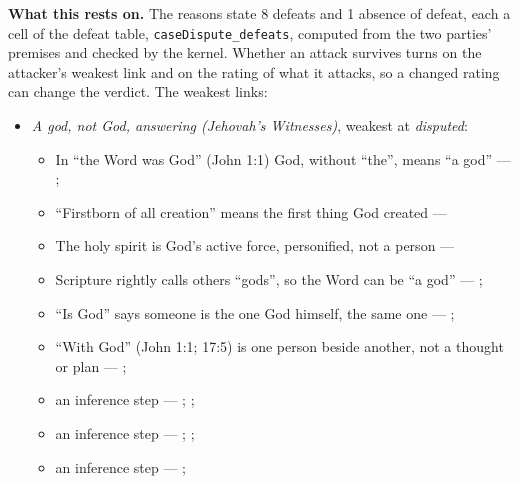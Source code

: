 \documentclass[11pt,paper=\testimonypaper,DIV=13,parskip=false]{scrartcl}
\begin{document}
\par\noindent\textbf{What this rests on.} The reasons state 8 defeats and 1 absence of defeat, each a cell of the defeat table, \texttt{case\allowbreak{}Dispute\_\allowbreak{}defeats}, computed from the two parties' premises and checked by the kernel. Whether an attack survives turns on the attacker's weakest link and on the rating of what it attacks, so a changed rating can change the verdict. The weakest links:
\begin{itemize}
\item \emph{A god, not God, answering (Jehovah’s Witnesses)}, weakest at \emph{disputed}:
\begin{itemize}
\item In “the Word was God” (John 1:1) God, without “the”, means “a god” --- \cite[27]{watchtower-should-you-believe-trinity-1989}; \cite{new-world-translation-2013}
\item “Firstborn of all creation” means the first thing God created --- \cite[14]{watchtower-should-you-believe-trinity-1989}
\item The holy spirit is God’s active force, personified, not a person --- \cite[20--23]{watchtower-should-you-believe-trinity-1989}
\item Scripture rightly calls others “gods”, so the Word can be “a god” --- \cite[28]{watchtower-should-you-believe-trinity-1989}; \cite[31]{watchtower-questions-from-readers-1986}
\item “Is God” says someone is the one God himself, the same one --- \cite[ch. 8, Are Jesus and the Father One in Purpose Only?]{bernard-oneness-of-god-1983}; \cite[27]{watchtower-should-you-believe-trinity-1989}
\item “With God” (John 1:1; 17:5) is one person beside another, not a thought or plan --- \cite[3, The Triune God]{kibbey-living-systematic-theology-2026}; \cite[27]{watchtower-should-you-believe-trinity-1989}
\item an inference step --- \cite[28]{watchtower-should-you-believe-trinity-1989}; \cite[31]{watchtower-questions-from-readers-1986}; \cite[Origen, Against Celsus V.39]{roberts-ante-nicene-fathers-4-1885}
\item an inference step --- \cite[ch. 8, Are Jesus and the Father One in Purpose Only?]{bernard-oneness-of-god-1983}; \cite[27]{watchtower-should-you-believe-trinity-1989}; \cite[I, q. 28, a. 3]{aquinas-summa-1920}
\item an inference step --- \cite[23]{watchtower-should-you-believe-trinity-1989}; \cite[122--123]{roberts-christendom-astray}

\end{itemize}
\end{itemize}
\end{document}
